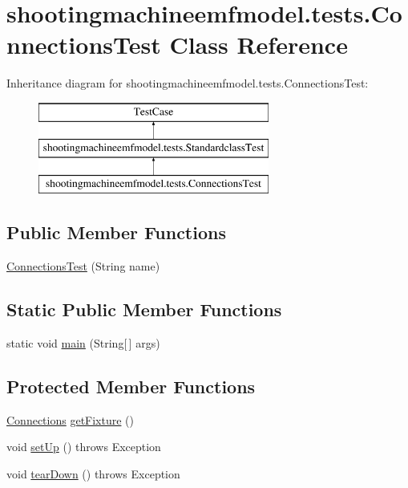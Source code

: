\hypertarget{classshootingmachineemfmodel_1_1tests_1_1_connections_test}{\section{shootingmachineemfmodel.\-tests.\-Connections\-Test Class Reference}
\label{classshootingmachineemfmodel_1_1tests_1_1_connections_test}
}
Inheritance diagram for shootingmachineemfmodel.\-tests.\-Connections\-Test\-:\begin{figure}[H]
\begin{center}
\leavevmode
\includegraphics[height=3.000000cm]{classshootingmachineemfmodel_1_1tests_1_1_connections_test}
\end{center}
\end{figure}
\subsection*{Public Member Functions}
\begin{DoxyCompactItemize}
\item 
\hyperlink{classshootingmachineemfmodel_1_1tests_1_1_connections_test_aa29c9b2f428b8e0150115badafab372e}{Connections\-Test} (String name)
\end{DoxyCompactItemize}
\subsection*{Static Public Member Functions}
\begin{DoxyCompactItemize}
\item 
static void \hyperlink{classshootingmachineemfmodel_1_1tests_1_1_connections_test_a44aff6efbe3a6808754fdd6ac8f9965c}{main} (String\mbox{[}$\,$\mbox{]} args)
\end{DoxyCompactItemize}
\subsection*{Protected Member Functions}
\begin{DoxyCompactItemize}
\item 
\hyperlink{interfaceshootingmachineemfmodel_1_1_connections}{Connections} \hyperlink{classshootingmachineemfmodel_1_1tests_1_1_connections_test_a9c7e9d232dd7c044cb5fe3b7bc544ff5}{get\-Fixture} ()
\item 
void \hyperlink{classshootingmachineemfmodel_1_1tests_1_1_connections_test_ac367b982799447ec0244a80637899599}{set\-Up} ()  throws Exception 
\item 
void \hyperlink{classshootingmachineemfmodel_1_1tests_1_1_connections_test_a1f25d3a18e600f388d04259fc6092a7e}{tear\-Down} ()  throws Exception 
\end{DoxyCompactItemize}
